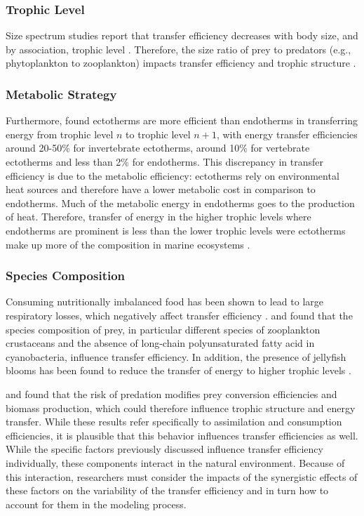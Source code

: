 \documentclass[oneside,12pt,final]{sty/ucthesis-CA2012}
\let\cite\citep                             %
\begin{document}
\begin{mainmatter}
\subsubsection{Trophic Level}
Size spectrum studies report that transfer efficiency decreases with body size, and by association, trophic level \cite{barnes2010global}. Therefore, the size ratio of prey to predators (e.g., phytoplankton to zooplankton) impacts transfer efficiency and trophic structure 
\cite{havens1998size, garciacomas2016prey}.

\subsubsection{Metabolic Strategy}
Furthermore, \citet{may1983ecology} found ectotherms are more efficient than endotherms in transferring energy from trophic level $n$ to trophic level $n+1$, with energy transfer efficiencies around 20-50\% for invertebrate ectotherms, around 10\% for vertebrate ectotherms and less than 2\% for endotherms. This discrepancy in transfer efficiency is due to the metabolic efficiency: ectotherms rely on environmental heat sources and therefore have a lower metabolic cost in comparison to endotherms. Much of the metabolic energy in endotherms goes to the production of heat. Therefore, transfer of energy in the higher trophic levels where endotherms are prominent is less than the lower trophic levels were ectotherms make up more of the composition in marine ecosystems \cite{mcgarvey2018two}.

\subsubsection{Species Composition}
Consuming nutritionally imbalanced food has been shown to lead to large respiratory losses, which negatively affect transfer efficiency \cite{persson2007food}. \citet{karlsson2007differences} and \citet{vonelert2003absence} found that the species composition of prey, in particular different species of zooplankton crustaceans and the absence of long-chain polyunsaturated fatty acid in cyanobacteria, influence transfer efficiency. In addition, the presence of jellyfish blooms has been found to reduce the transfer of energy to higher trophic levels \cite{condon2011jellyfish}.

\vspace{5mm}

\citet{trussell2006fear} and \citet{schmitz2008individuals} found that the risk of predation modifies prey conversion efficiencies and biomass production, which could therefore influence trophic structure and energy transfer. While these results refer specifically to assimilation and consumption efficiencies, it is plausible that this behavior influences transfer efficiencies as well. While the specific factors  previously discussed influence transfer efficiency individually, these components interact in the natural environment. Because of this interaction, researchers must consider the impacts of the synergistic effects of these factors on the variability of the transfer efficiency and in turn how to account for them in the modeling process.  


\end{mainmatter}
\end{document}
